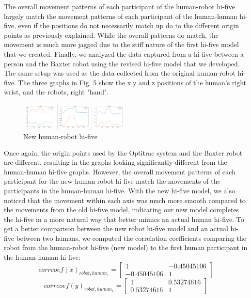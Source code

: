 \documentclass[letterpaper, 10 pt, conference]{ieeeconf}  %
\begin{document}
\newline
\indent The overall movement patterns of each participant of the human-robot hi-five largely match the movement patterns of each participant of the human-human hi-five, even if the positions do not necessarily match up do to the different origin points as previously explained. While the overall patterns do match, the movement is much more jagged due to the stiff nature of the first hi-five model that we created.
\newline
\indent Finally, we analyzed the data captured from a hi-five between a person and the Baxter robot using the revised hi-five model that we developed. The same setup was used as the data collected from the original human-robot hi-five. The three graphs in Fig. 5 show the x,y and z positions of the human's right wrist, and the robots, right "hand".
\begin{figure}[h]
\centering
\includegraphics[width=0.5\textwidth]{newfive.png}
\caption{New human-robot hi-five}
\end{figure}
\newline
\indent Once again, the origin points used by the Optitrac system and the Baxter robot are different, resulting in the graphs looking significantly different from the human-human hi-five graphs. However, the overall movement patterns of each participant for the new human-robot hi-five match the movements of the participants in the human-human hi-five. With the new hi-five model, we also noticed that the movement within each axis was much more smooth compared to the movements from the old hi-five model, indicating our new model completes the hi-five in a more natural way that better mimics an actual human hi-five.
\newline
\indent To get a better comparison between the new robot hi-five model and an actual hi-five between two humans, we computed the correlation coefficients comparing the robot from the human-robot hi-five (new model) to the first human participant in the human-human hi-five:
\[
corrcoef(x)_{robot, human_1} = \begin{bmatrix}
	1 & -0.45045106 \\
	-0.45045106 & 1
\end{bmatrix}
\]
\newline
\[
corrcoef(y)_{robot, human_1} = \begin{bmatrix}
	1 & 0.53274616 \\
	0.53274616 & 1
\end{bmatrix}
\]
\end{document}
